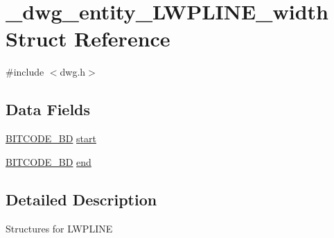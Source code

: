 \hypertarget{struct__dwg__entity__LWPLINE__width}{\section{\-\_\-dwg\-\_\-entity\-\_\-\-L\-W\-P\-L\-I\-N\-E\-\_\-width \-Struct \-Reference}
\label{struct__dwg__entity__LWPLINE__width}
}


{\ttfamily \#include $<$dwg.\-h$>$}

\subsection*{\-Data \-Fields}
\begin{DoxyCompactItemize}
\item 
\hyperlink{dwg_8h_a3c1e6781466b74ba07785d57da70ed97}{\-B\-I\-T\-C\-O\-D\-E\-\_\-\-B\-D} \hyperlink{struct__dwg__entity__LWPLINE__width_a2904492879b1befb6c85bff743920ee5}{start}
\item 
\hyperlink{dwg_8h_a3c1e6781466b74ba07785d57da70ed97}{\-B\-I\-T\-C\-O\-D\-E\-\_\-\-B\-D} \hyperlink{struct__dwg__entity__LWPLINE__width_a2d240765585d8e4bc8b73b6109ba1c40}{end}
\end{DoxyCompactItemize}


\subsection{\-Detailed \-Description}
\-Structures for \-L\-W\-P\-L\-I\-N\-E 

